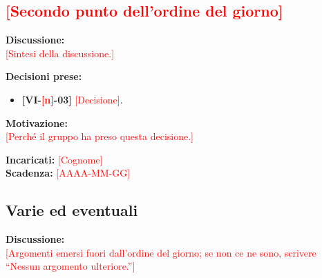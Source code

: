 \documentclass[12pt,a4paper]{article}
\newcommand{\vnum}{\ph{n}}                     %
\newcommand{\ph}[1]{\textcolor{red}{[#1]}}                        %
\newcommand{\thc}[1]{\textcolor{white}{\textbf{#1}}}              %
\newcommand{\rl}{\arrayrulecolor{bfline}\hline}                   %
\newcommand{\tightlist}{\setlength{\itemsep}{1pt}\setlength{\parskip}{0pt}}
\begin{document}
\hypertarget{odg-2}{%
\subsection{\ph{Secondo punto dell'ordine del giorno}}}

\textbf{Discussione:}\\
\ph{Sintesi della discussione.}

\textbf{Decisioni prese:}
\begin{itemize}
\tightlist
\item[$\checkmark$] \textbf{[VI-\vnum-03]} \ph{Decisione}.
\end{itemize}

\textbf{Motivazione:}\\
\ph{Perché il gruppo ha preso questa decisione.}

\textbf{Incaricati:} \ph{Cognome}\\
\textbf{Scadenza:} \ph{AAAA-MM-GG}

%

\hypertarget{varie-ed-eventuali}{%
\subsection{Varie ed eventuali}}

\textbf{Discussione:}\\
\ph{Argomenti emersi fuori dall'ordine del giorno; se non ce ne sono, scrivere ``Nessun argomento ulteriore.''}
\end{document}
